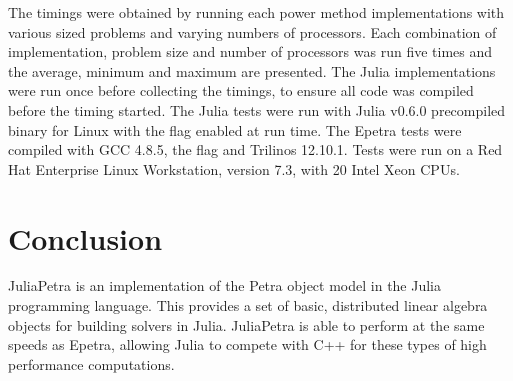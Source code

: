 \documentclass[acmsmall]{acmart}
\newcommand{\juliaSnippet}[1]{\texttt{\detokenize{#1}}}
\begin{document}
The timings were obtained by running each power method implementations
with various sized problems and varying numbers of processors.
Each combination of implementation, problem size and number of processors was run five times
and the average, minimum and maximum are presented.
The Julia implementations were run once before collecting the timings, to ensure all code was
compiled before the timing started.
The Julia tests were run with Julia v0.6.0 precompiled binary for Linux
with the \juliaSnippet{-O3} flag enabled at run time.
The Epetra tests were compiled with GCC 4.8.5, the \juliaSnippet{-O3} flag and Trilinos 12.10.1.
Tests were run on a Red Hat Enterprise Linux Workstation, version 7.3,
with 20 Intel Xeon CPUs.


\section{Conclusion}

JuliaPetra is an implementation of the Petra object model in the Julia programming language.
This provides a set of basic, distributed linear algebra objects for building solvers in Julia.
JuliaPetra is able to perform at the same speeds as Epetra,
allowing Julia to compete with C++ for these types of high performance computations.


\end{document}
